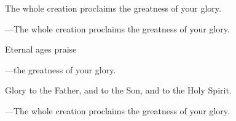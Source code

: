 \responsory
\begin{hangpar}

The whole creation proclaims the greatness of your glory.

{\color{red}---\thinspace}The whole creation proclaims the greatness of your glory.

\medskip Eternal ages praise

{\color{red}---\thinspace}the greatness of your glory.

\medskip Glory to the Father, and to the Son, and to the Holy Spirit.

{\color{red}---\thinspace}The whole creation proclaims the greatness of your glory.
\end{hangpar}
